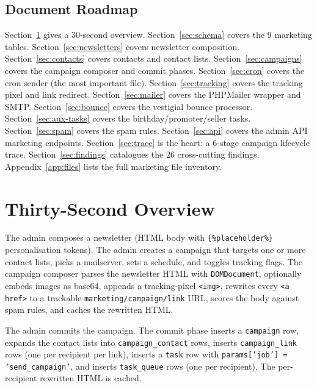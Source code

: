 \documentclass[11pt,a4paper]{article}
\begin{document}
\subsection{Document Roadmap}

Section~\ref{sec:overview} gives a 30-second overview.
Section~\ref{sec:schema} covers the 9 marketing tables.
Section~\ref{sec:newsletters} covers newsletter composition.
Section~\ref{sec:contacts} covers contacts and contact lists.
Section~\ref{sec:campaigns} covers the campaign composer and
commit phases.
Section~\ref{sec:cron} covers the cron sender (the most important
file).
Section~\ref{sec:tracking} covers the tracking pixel and link
redirect.
Section~\ref{sec:mailer} covers the PHPMailer wrapper and SMTP.
Section~\ref{sec:bounce} covers the vestigial bounce processor.
Section~\ref{sec:aux-tasks} covers the birthday/promoter/seller
tasks.
Section~\ref{sec:spam} covers the spam rules.
Section~\ref{sec:api} covers the admin API marketing endpoints.
Section~\ref{sec:trace} is the heart: a 6-stage campaign lifecycle
trace.
Section~\ref{sec:findings} catalogues the 26 cross-cutting
findings. Appendix~\ref{app:files} lists the full marketing file
inventory.

\section{Thirty-Second Overview}\label{sec:overview}

The admin composes a newsletter (HTML body with
\texttt{\{\%placeholder\%\}} personalisation tokens). The admin
creates a campaign that targets one or more contact lists, picks a
mailserver, sets a schedule, and toggles tracking flags. The
campaign composer parses the newsletter HTML with
\texttt{DOMDocument}, optionally embeds images as base64, appends a
tracking-pixel \texttt{<img>}, rewrites every \texttt{<a href>} to
a trackable \texttt{marketing/campaign/link} URL, scores the body
against spam rules, and caches the rewritten HTML.

The admin commits the campaign. The commit phase inserts a
\texttt{campaign} row, expands the contact lists into
\texttt{campaign\_contact} rows, inserts \texttt{campaign\_link}
rows (one per recipient per link), inserts a \texttt{task} row
with \texttt{params['job'] = 'send\_campaign'}, and inserts
\texttt{task\_queue} rows (one per recipient). The per-recipient
rewritten HTML is cached.
\end{document}
